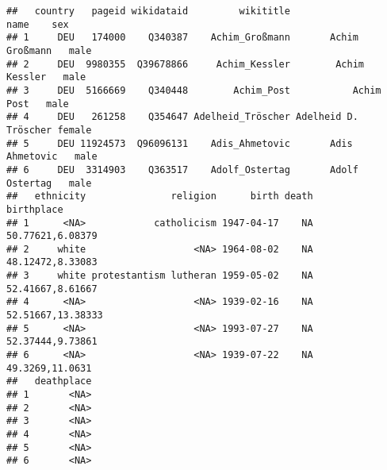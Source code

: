 \documentclass[
]{article}
\begin{document}
\begin{verbatim}
##   country   pageid wikidataid         wikititle                 name    sex
## 1     DEU   174000    Q340387    Achim_Großmann       Achim Großmann   male
## 2     DEU  9980355  Q39678866     Achim_Kessler        Achim Kessler   male
## 3     DEU  5166669    Q340448        Achim_Post           Achim Post   male
## 4     DEU   261258    Q354647 Adelheid_Tröscher Adelheid D. Tröscher female
## 5     DEU 11924573  Q96096131    Adis_Ahmetovic       Adis Ahmetovic   male
## 6     DEU  3314903    Q363517    Adolf_Ostertag       Adolf Ostertag   male
##   ethnicity               religion      birth death        birthplace
## 1      <NA>            catholicism 1947-04-17    NA  50.77621,6.08379
## 2     white                   <NA> 1964-08-02    NA  48.12472,8.33083
## 3     white protestantism lutheran 1959-05-02    NA  52.41667,8.61667
## 4      <NA>                   <NA> 1939-02-16    NA 52.51667,13.38333
## 5      <NA>                   <NA> 1993-07-27    NA  52.37444,9.73861
## 6      <NA>                   <NA> 1939-07-22    NA   49.3269,11.0631
##   deathplace
## 1       <NA>
## 2       <NA>
## 3       <NA>
## 4       <NA>
## 5       <NA>
## 6       <NA>

\end{verbatim}
\end{document}
